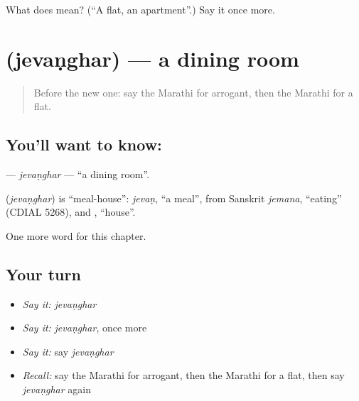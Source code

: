 \begin{tcolorbox}[breakable,colback=teal!4,colframe=teal!35!black,title={Before you move on}]
What does  mean? (\textquotedblleft{}A flat, an apartment\textquotedblright{}.) Say it once more.
\end{tcolorbox}
\section[\texorpdfstring{\mr{जेवणघर} (jevaṇghar)}{जेवणघर (jevaṇghar)}]{ (jevaṇghar) — a dining room}

\label{lesson:MR-C178-jevanghar}



\begin{quote}
Before the new one: say the Marathi for arrogant, then the Marathi for a flat.
\end{quote}

\subsection*{You'll want to know: }
\textbf{} — \emph{jevaṇghar} — \textquotedblleft{}a dining room\textquotedblright{}.

\begin{cousinweb}
\textbf{} (\emph{jevaṇghar}) is \textquotedblleft{}meal-house\textquotedblright{}: \emph{jevaṇ}, \textquotedblleft{}a meal\textquotedblright{}, from Sanskrit \emph{jemana}, \textquotedblleft{}eating\textquotedblright{} (CDIAL 5268), and \textbf{}, \textquotedblleft{}house\textquotedblright{}.
\end{cousinweb}

\begin{grammarlens}[title={What you've built}]
One more word for this chapter.
\end{grammarlens}

\subsection*{Your turn}
\begin{itemize}
\raggedright
  \item \emph{Say it:} \emph{jevaṇghar}
  \item \emph{Say it:} \emph{jevaṇghar}, once more
  \item \emph{Say it:} say \emph{jevaṇghar}
  \item \emph{Recall:} say the Marathi for arrogant, then the Marathi for a flat, then say \emph{jevaṇghar} again
\end{itemize}

